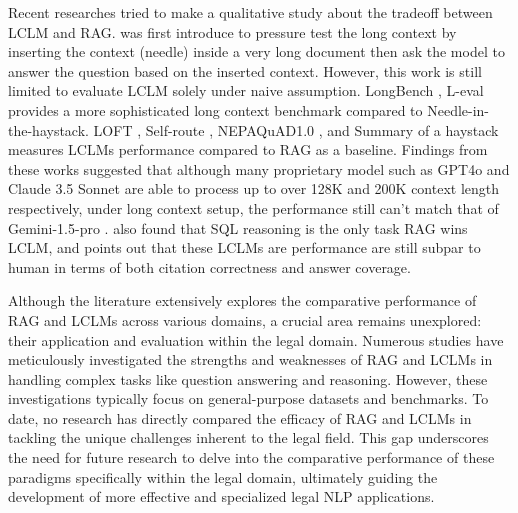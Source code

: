 {
Recent researches tried to make a qualitative study about the tradeoff between LCLM and RAG. \cite{needleinahaystack} was first introduce to pressure test the long context by inserting the context (needle) inside a very long document then ask the model to answer the question based on the inserted context. 
However, this work is still limited to evaluate LCLM solely under naive assumption. LongBench \cite{longbench}, L-eval \cite{leval} provides a more sophisticated long context benchmark compared to Needle-in-the-haystack. 
LOFT \cite{loft}, Self-route \cite{selfroute}, NEPAQuAD1.0 \cite{nepaquad}, and Summary of a haystack \cite{laban2024summaryhaystackchallengelongcontext} measures LCLMs performance compared to RAG as a baseline. Findings from these works suggested that although many proprietary model such as GPT4o \cite{gpt4o} and Claude 3.5 Sonnet \cite{claude3.5sonnet} are able to process up to over 128K and 200K context length respectively, under long context setup, the performance still can't match that of Gemini-1.5-pro \cite{leval, selfroute, laban2024summaryhaystackchallengelongcontext}. \cite{loft} also found that SQL reasoning is the only task RAG wins LCLM, and \cite{laban2024summaryhaystackchallengelongcontext} points out that these LCLMs are performance are still subpar to human in terms of both citation correctness and answer coverage. 
}

Although the literature extensively explores the comparative performance of RAG and LCLMs across various domains, a crucial area remains unexplored: their application and evaluation within the legal domain. Numerous studies have meticulously investigated the strengths and weaknesses of RAG and LCLMs in handling complex tasks like question answering and reasoning. However, these investigations typically focus on general-purpose datasets and benchmarks. To date, no research has directly compared the efficacy of RAG and LCLMs in tackling the unique challenges inherent to the legal field. This gap underscores the need for future research to delve into the comparative performance of these paradigms specifically within the legal domain, ultimately guiding the development of more effective and specialized legal NLP applications.